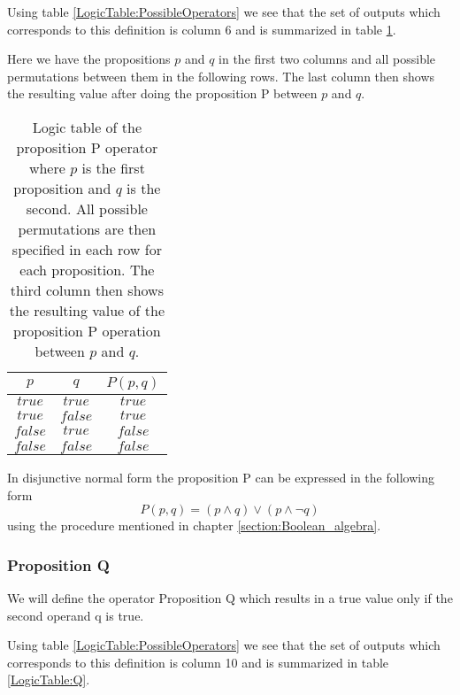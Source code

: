         Using table \ref{LogicTable:PossibleOperators} we see that the set of outputs which corresponds to this definition is column 6 and is summarized in table \ref{LogicTable:P}.
        
        Here we have the propositions $p$ and $q$ in the first two columns and all possible permutations between them in the following rows. The last column then shows the resulting value after doing the proposition P between $p$ and $q$.
        
        \begin{table}[h!]
            \centering
            \begin{tabular}{|c|c|c|}
            	\hline
            	  $p$   &   $q$   & $P(p, q)$ \\ \hline
            	$true$  & $true$  &  $true$   \\ \hline
            	$true$  & $false$ &  $true$   \\ \hline
            	$false$ & $true$  &  $false$  \\ \hline
            	$false$ & $false$ &  $false$  \\ \hline
            \end{tabular}
            \caption{Logic table of the proposition P operator where $p$ is the first proposition and $q$ is the second. All possible permutations are then specified in each row for each proposition. The third column then shows the resulting value of the proposition P operation between $p$ and $q$.}
            \label{LogicTable:P}
        \end{table}
        
        In disjunctive normal form the proposition P can be expressed in the following form
        \begin{equation}
            P(p, q) = (p \wedge q) \vee (p \wedge \neg q)
        \end{equation}
        using the procedure mentioned in chapter \ref{section:Boolean_algebra}.
    
    \subsubsection{Proposition Q}
        We will define the operator Proposition Q which results in a true value only if the second operand q is true.
        
        Using table \ref{LogicTable:PossibleOperators} we see that the set of outputs which corresponds to this definition is column 10 and is summarized in table \ref{LogicTable:Q}.
        
